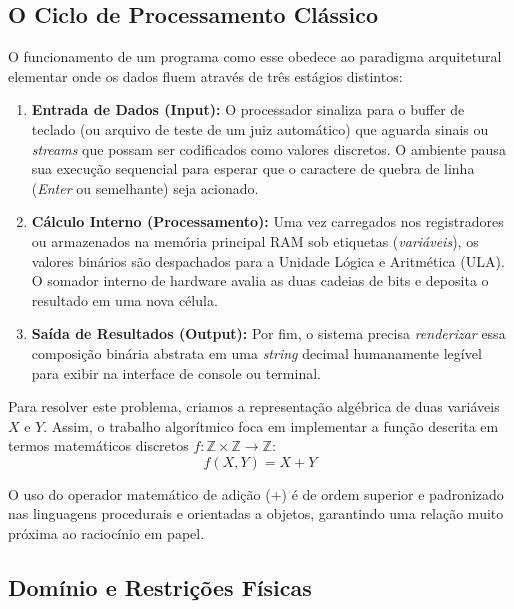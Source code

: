 \documentclass[11pt]{article}
\begin{document}
\subsection*{O Ciclo de Processamento Clássico}

O funcionamento de um programa como esse obedece ao paradigma arquitetural elementar onde os dados fluem através de três estágios distintos:
\begin{enumerate}
    \item \textbf{Entrada de Dados (Input):} O processador sinaliza para o buffer de teclado (ou arquivo de teste de um juiz automático) que aguarda sinais ou \textit{streams} que possam ser codificados como valores discretos. O ambiente pausa sua execução sequencial para esperar que o caractere de quebra de linha (\textit{Enter} ou semelhante) seja acionado.
    \item \textbf{Cálculo Interno (Processamento):} Uma vez carregados nos registradores ou armazenados na memória principal RAM sob etiquetas (\textit{variáveis}), os valores binários são despachados para a Unidade Lógica e Aritmética (ULA). O somador interno de hardware avalia as duas cadeias de bits e deposita o resultado em uma nova célula.
    \item \textbf{Saída de Resultados (Output):} Por fim, o sistema precisa \textit{renderizar} essa composição binária abstrata em uma \textit{string} decimal humanamente legível para exibir na interface de console ou terminal.
\end{enumerate}

Para resolver este problema, criamos a representação algébrica de duas variáveis $X$ e $Y$. Assim, o trabalho algorítmico foca em implementar a função descrita em termos matemáticos discretos $f: \mathbb{Z} \times \mathbb{Z} \to \mathbb{Z}$:
\[ f(X, Y) = X + Y \]

O uso do operador matemático de adição ($+$) é de ordem superior e padronizado nas linguagens procedurais e orientadas a objetos, garantindo uma relação muito próxima ao raciocínio em papel.

\subsection*{Domínio e Restrições Físicas}
\end{document}
